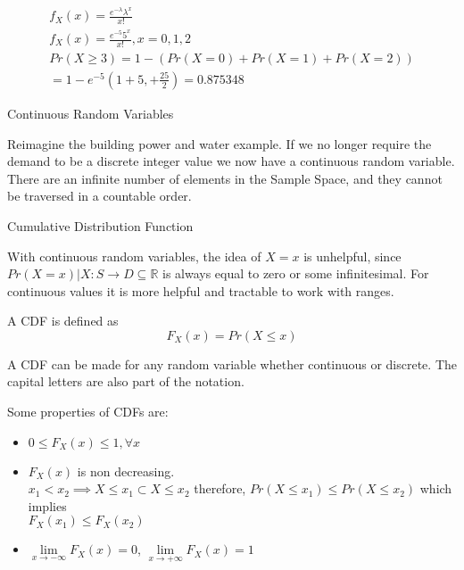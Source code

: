 \documentclass{report}
\begin{document}
\begin{description}
\begin{mdframed}
             \begin{gather}
                 f_X(x) = \frac{e^{-\lambda} \lambda^x}{x!}\\
                 f_X(x) = \frac{e^{-5} 5^x}{x!}, x = 0, 1, 2\\
                 Pr(X \ge 3) = 1 - (Pr(X = 0) + Pr(X = 1) + Pr(X = 2))\\ 
                 = 1 - e^{-5}(1 + 5, + \frac{25}{2}) = 0.875348
            \end{gather}
        \end{mdframed}
        \pagebreak
    \item {\Large Continuous Random Variables}
        \begin{mdframed}
            Reimagine the building power and water
            example. If we no longer require the
            demand to be a discrete integer value
            we now have a continuous random variable.
            There are an infinite number of elements
            in the Sample Space, and they cannot be traversed
            in a countable order.
        \end{mdframed}
    \item {\Large Cumulative Distribution Function}
        \begin{mdframed}
            With continuous random variables, the idea of
            $X = x$ is unhelpful, since  $Pr(X = x) 
            | X : S \to D \subseteq \mathbb{R}$ is always
            equal to zero or some infinitesimal. For continuous
            values it is more helpful and tractable to work with
            ranges.

            A CDF is defined as 
             \begin{displaymath}
                F_X(x) = Pr(X \le x)
            \end{displaymath}

            A CDF can be made for any random variable whether
            continuous or discrete. The capital letters are
            also part of the notation.

            Some properties of CDFs are:
            \begin{itemize}
                \item $0 \le F_X(x) \le 1, \forall x$
                \item  $F_X(x)$ is non decreasing.\\
                    $x_1 < x_2 \implies {X \le x_1} \subset {X \le x_2}$
                    therefore,
                    $Pr(X\le x_1) \le Pr(X\le x_2)$ 
                    which implies\\
                    $F_X(x_1) \le F_X(x_2)$ 
                \item $\lim\limits_{x \to -\infty} F_X(x) = 0$, 
                    $\lim\limits_{x \to +\infty} F_X(x) = 1$ 


\end{itemize}
\end{mdframed}
\end{description}
\end{document}
